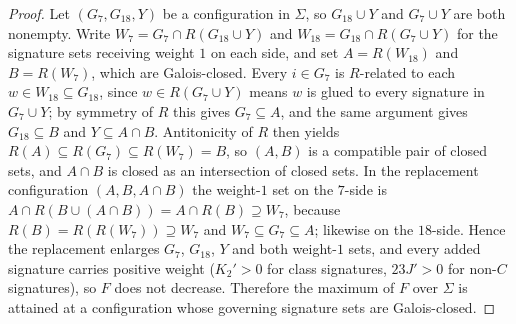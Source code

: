 \documentclass[11pt,a4paper]{article}
\theoremstyle{plain}
\theoremstyle{definition}
\theoremstyle{remark}
\begin{document}
\begin{proof}
Let $(G_7, G_{18}, Y)$ be a configuration in $\Sigma$, so $G_{18} \cup Y$ and $G_7 \cup Y$ are both
nonempty. Write $W_7 = G_7 \cap R(G_{18} \cup Y)$ and $W_{18} = G_{18} \cap R(G_7 \cup Y)$ for the
signature sets receiving weight $1$ on each side, and set $A = R(W_{18})$ and $B = R(W_7)$, which
are Galois-closed. Every $i \in G_7$ is $R$-related to each $w \in W_{18} \subseteq G_{18}$, since
$w \in R(G_7 \cup Y)$ means $w$ is glued to every signature in $G_7 \cup Y$; by symmetry of $R$ this
gives $G_7 \subseteq A$, and the same argument gives $G_{18} \subseteq B$ and $Y \subseteq A \cap B$.
Antitonicity of $R$ then yields $R(A) \subseteq R(G_7) \subseteq R(W_7) = B$, so $(A, B)$ is a
compatible pair of closed sets, and $A \cap B$ is closed as an intersection of closed sets. In the
replacement configuration $(A, B, A \cap B)$ the weight-$1$ set on the $7$-side is
$A \cap R(B \cup (A \cap B)) = A \cap R(B) \supseteq W_7$, because $R(B) = R(R(W_7)) \supseteq W_7$
and $W_7 \subseteq G_7 \subseteq A$; likewise on the $18$-side. Hence the replacement enlarges
$G_7$, $G_{18}$, $Y$ and both weight-$1$ sets, and every added signature carries positive weight
($K_2' > 0$ for class signatures, $23J' > 0$ for non-$C$ signatures), so $F$ does not decrease.
Therefore the maximum of $F$ over $\Sigma$ is attained at a configuration whose governing signature
sets are Galois-closed.
\end{proof}
\end{document}
